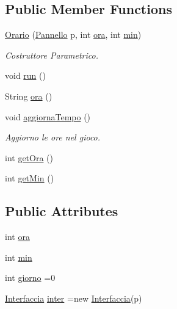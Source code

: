 \subsection*{Public Member Functions}
\begin{DoxyCompactItemize}
\item 
\hyperlink{classa_1_1survival_1_1game_1_1_orario_a57c99bdca03a56a4712e83bbce52ca25}{Orario} (\hyperlink{classa_1_1survival_1_1game_1_1_pannello}{Pannello} p, int \hyperlink{classa_1_1survival_1_1game_1_1_orario_aa2b74e08727f05e180669d8822966c0b}{ora}, int \hyperlink{classa_1_1survival_1_1game_1_1_orario_a3e202b201e6255d975cd6d3aff1f5a4d}{min})
\begin{DoxyCompactList}\small\item\em Costruttore Parametrico. \end{DoxyCompactList}\item 
void \hyperlink{classa_1_1survival_1_1game_1_1_orario_a13a43e6d814de94978c515cb084873b1}{run} ()
\item 
String \hyperlink{classa_1_1survival_1_1game_1_1_orario_a5dbecc8b3d698dae712952c4b30a4699}{ora} ()
\item 
void \hyperlink{classa_1_1survival_1_1game_1_1_orario_a397c02a7ddd736008cf4def497937bf2}{aggiorna\+Tempo} ()
\begin{DoxyCompactList}\small\item\em Aggiorno le ore nel gioco. \end{DoxyCompactList}\item 
int \hyperlink{classa_1_1survival_1_1game_1_1_orario_afabaf052fc488e8c99104046a342feea}{get\+Ora} ()
\item 
int \hyperlink{classa_1_1survival_1_1game_1_1_orario_a51f5173282f478ea52841f6d8a77312b}{get\+Min} ()
\end{DoxyCompactItemize}
\subsection*{Public Attributes}
\begin{DoxyCompactItemize}
\item 
int \hyperlink{classa_1_1survival_1_1game_1_1_orario_aa2b74e08727f05e180669d8822966c0b}{ora}
\item 
int \hyperlink{classa_1_1survival_1_1game_1_1_orario_a3e202b201e6255d975cd6d3aff1f5a4d}{min}
\item 
int \hyperlink{classa_1_1survival_1_1game_1_1_orario_a03c063c009dfa59316d2ce58666c7235}{giorno} =0
\item 
\hyperlink{classa_1_1survival_1_1game_1_1_interfaccia}{Interfaccia} \hyperlink{classa_1_1survival_1_1game_1_1_orario_a7d95b5f74818836fb88e49da06f67d1e}{inter} =new \hyperlink{classa_1_1survival_1_1game_1_1_interfaccia}{Interfaccia}(p)
\end{DoxyCompactItemize}


